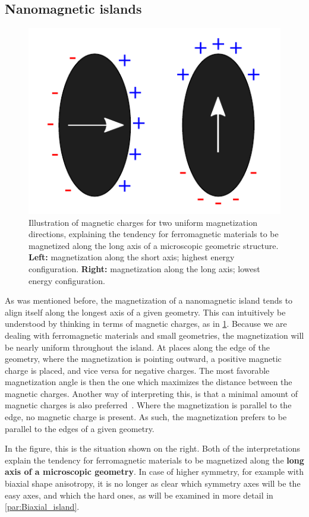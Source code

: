 \documentclass[11pt,a4paper,english,twoside]{article}
\begin{document}
\subsection{Nanomagnetic islands}
\label{par:Intro_nanomagnetic-islands}
\begin{figure}[b!]
    \centering
    \includegraphics[width=0.5\columnwidth]{Figures/Introduction/Longaxis.pdf}
    \caption{Illustration of magnetic charges for two uniform magnetization directions, explaining the tendency for ferromagnetic materials to be magnetized along the long axis of a microscopic geometric structure. \textbf{Left:} magnetization along the short axis; highest energy configuration. \textbf{Right:} magnetization along the long axis; lowest energy configuration.}
    \label{fig:Intro_IslandEllipticPreferredDirection}
\end{figure}
As was mentioned before, the magnetization of a nanomagnetic island tends to align itself along the longest axis of a given geometry. This can intuitively be understood by thinking in terms of magnetic charges, as in \cref{fig:Intro_IslandEllipticPreferredDirection}. Because we are dealing with ferromagnetic materials and small geometries, the magnetization will be nearly uniform throughout the island. At places along the edge of the geometry, where the magnetization is pointing outward, a positive magnetic charge is placed, and vice versa for negative charges. The most favorable magnetization angle is then the one which maximizes the distance between the magnetic charges. Another way of interpreting this, is that a minimal amount of magnetic charges is also preferred~\cite{MagneticCharge}. Where the magnetization is parallel to the edge, no magnetic charge is present. As such, the magnetization prefers to be parallel to the edges of a given geometry. \par
In the figure, this is the situation shown on the right. Both of the interpretations explain the tendency for ferromagnetic materials to be magnetized along the \textbf{long axis of a microscopic geometry}. In case of higher symmetry, for example with biaxial shape anisotropy, it is no longer as clear which symmetry axes will be the easy axes, and which the hard ones, as will be examined in more detail in \cref{par:Biaxial_island}. \par
\end{document}
